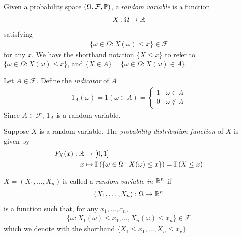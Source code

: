 \documentclass{../template/note}
\begin{document}
    \begin{definition}
        \label{random-variables}
        Given a probability space \((\Omega, \mathcal F, \mathbb P)\), a \emph{random variable} is a function
        \begin{align*}
            X: \Omega \to \mathbb R
        \end{align*}
        satisfying
        \begin{align*}
            \{\omega \in \Omega : X(\omega) \leq x\} \in \mathcal F
        \end{align*}
        for any \(x\). We have the shorthand notation \(\{X \leq x\}\) to refer to \(\{\omega \in \Omega: X(\omega) \leq x\}\), and \(\{X \in A\} = \{\omega \in \Omega: X(\omega) \in A\}\).
    \end{definition}
    
    \begin{definition}
        Let \(A \in \mathcal F\). Define the \emph{indicator} of \(A\)
        \begin{align*}
            1_A(\omega) = 1(\omega \in A) = \begin{cases}
                1 & \omega \in A \\
                0 & \omega \notin A
            \end{cases}
        \end{align*}
        Since \(A \in \mathcal F\), \(1_A\) is a random variable.        
    \end{definition}

    \begin{definition}
        \label{probability-distribution-function}
        Suppose \(X\) is a random variable. The \emph{probability distribution function} of \(X\) is given by
        \begin{align*}
            F_X(x): \mathbb R &\to [0, 1] \\
            x &\mapsto \mathbb P(\{\omega \in \Omega: X(\omega) \leq x\}) = \mathbb P(X \leq x)
        \end{align*}
    \end{definition}
    
    \begin{definition}
        \(X = (X_1, \dots, X_n)\) is called a \emph{random variable in \(\mathbb R^n\)} if
        \begin{align*}
            (X_1, \dots, X_n): \Omega \to \mathbb R^n
        \end{align*}
        is a function such that, for any \(x_1, \dots, x_n\),
        \begin{align*}
            \{\omega: X_1(\omega) \leq x_1, \dots, X_n(\omega) \leq x_n\} \in \mathcal F
        \end{align*}
        which we denote with the shorthand \(\{X_1 \leq x_1, \dots, X_n \leq x_n\}\).
    \end{definition}
    
\end{document}
